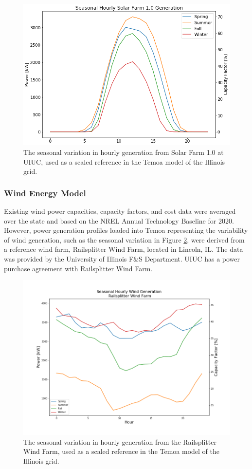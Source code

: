 \begin{figure}[H]
	\centering
	\includegraphics[width=0.7\columnwidth]{./img/seasonal_hourly_solar.png}
	\caption{}
	\caption{The seasonal variation in hourly generation from Solar Farm 
        1.0 at \gls{UIUC}, used as a scaled reference in the Temoa model of the Illinois grid. }
	\label{fig:seasonal_hourly_solar}
\end{figure}

\FloatBarrier

\subsubsection{Wind Energy Model}
Existing wind power capacities, capacity factors, and cost data were averaged over the state and 
based on the \gls{NREL} Annual Technology Baseline for 2020. However, power 
generation profiles loaded into Temoa representing the variability of wind 
generation, such as the seasonal variation in Figure 
\ref{fig:seasonal_hourly_wind}, were derived from a reference wind farm, Railsplitter Wind Farm, 
located in Lincoln, IL. The data was provided by the University of Illinois 
F\&S Department. UIUC has a power purchase agreement with Railsplitter Wind 
Farm.


\begin{figure}[H]
	\centering
	\includegraphics[width=0.7\columnwidth]{./img/cap/seasonal_hourly_wind.png}
	\caption{The seasonal variation in hourly generation from the Railsplitter Wind Farm, used as a scaled reference in the Temoa model of the Illinois grid. }
	\label{fig:seasonal_hourly_wind}
\end{figure}
\FloatBarrier


